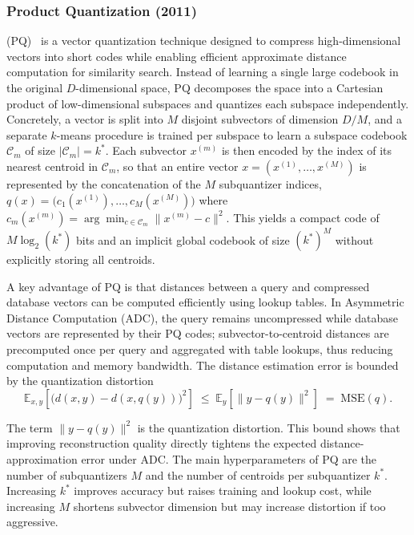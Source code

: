 \documentclass[sigconf]{acmart}
\begin{document}
\subsubsection{\textbf{Product Quantization (2011)}} (PQ)~\cite{pq} is a vector quantization technique designed to compress high-dimensional vectors into short codes while enabling efficient approximate distance computation for similarity search. 
Instead of learning a single large codebook in the original $D$-dimensional space, PQ decomposes the space into a Cartesian product of low-dimensional subspaces and quantizes each subspace independently.
Concretely, a vector is split into $M$ disjoint subvectors of dimension $D/M$, and a separate $k$-means procedure is trained per subspace to learn a subspace codebook $\mathcal{C}_m$ of size $|\mathcal{C}_m|=k^{*}$. 
Each subvector $x^{(m)}$ is then encoded by the index of its nearest centroid in $\mathcal{C}_m$, so that an entire vector $x=(x^{(1)},\ldots,x^{(M)})$ is represented by the concatenation of the $M$ subquantizer indices,
\( q(x) = \big(c_1(x^{(1)}), \ldots, c_M(x^{(M)})\big) \) where \( c_m(x^{(m)}) = \arg\min_{c \in \mathcal{C}_m} \|x^{(m)} - c\|^2. \)
This yields a compact code of $M\log_2(k^{*})$ bits and an implicit global codebook of size $(k^{*})^{M}$ without explicitly storing all centroids.

A key advantage of PQ is that distances between a query and compressed database vectors can be computed efficiently using lookup tables. 
In Asymmetric Distance Computation (ADC), the query remains uncompressed while database vectors are represented by their PQ codes; subvector-to-centroid distances are precomputed once per query and aggregated with table lookups, thus reducing computation and memory bandwidth. 
The distance estimation error is bounded by the quantization distortion
\[
\mathbb{E}_{x,y}\!\left[\big(d(x,y)-d(x,q(y))\big)^2\right]
\;\le\;
\mathbb{E}_{y}\!\left[\|y-q(y)\|^2\right]
\;=\; \mathrm{MSE}(q).
\]

The term $\|y-q(y)\|^2$ is the quantization distortion.
This bound shows that improving reconstruction quality directly tightens the expected distance-approximation error under ADC.
The main hyperparameters of PQ are the number of subquantizers $M$ and the number of centroids per subquantizer $k^*$.
Increasing $k^*$ improves accuracy but raises training and lookup cost, while increasing $M$ shortens subvector dimension but may increase distortion if too aggressive.
\end{document}
